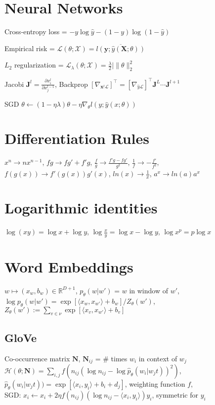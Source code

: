 \documentclass[a4paper, 11pt, landscape]{article}
\begin{document}
\begin{multicols*}{3}
\section{Neural Networks}
Cross-entropy loss = $-y\log\hat{y}-(1-y)\log(1-
\hat{y})$

Empirical risk = $ \mathcal{L}(\theta;\mathcal{X}) = \overline{l(\mathbf{y};\hat{y}(\mathbf{X};\theta))}$

$L_2$ regularization = $\mathcal{L}_\lambda(\theta;\mathcal{X}) = \frac{\lambda}{2}|\|\theta\|^2_2$

Jacobi $\mathbf{J}^l=\frac{\partial x^l_i}{\partial x^{l-1}_j}$,
Backprop $[\nabla_{\mathbf{x}^l\mathcal{L}}]^\top = [\nabla_{\hat{y}\mathcal{L}}]^\top \mathbf{J}^L \cdots \mathbf{J}^{l+1}$

SGD $\theta \gets (1-\eta\lambda)\theta-\eta\nabla_\theta l(y;\hat{y}(x;\theta))$

\section{Differentiation Rules}
$x^n \rightarrow nx^{n-1}$, 
$fg \rightarrow fg'+f'g$,
$\frac{f}{g} \rightarrow \frac{f'g-fg'}{g^2}$,
$\frac{1}{f} \rightarrow -\frac{f'}{f^2}$,
$f(g(x)) \rightarrow f'(g(x))g'(x)$,
$ln(x) \rightarrow \frac{1}{x}$,
$a^x \rightarrow ln(a)a^x$

\section{Logarithmic identities}
$\log(xy) = \log x + \log y$,
$\log\frac{x}{y} = \log x - \log y$,
$\log x^p = p \log x$

\section{Word Embeddings}
$w \mapsto (x_w,b_w) \in \mathbb{R}^{D+1}$,
$p_\theta (w|w')$ = $w$ in window of $w'$,
$\log p_\theta (w|w') = \exp[\langle x_w,x_{w'} \rangle + b_w] / Z_\theta (w')$,\\ $Z_\theta (w') := \sum_{v \in \nu}\exp[ \langle x_v,x_{w'} \rangle + b_v ]$

\subsection{GloVe}
Co-occurrence matrix $\mathbf{N}$, $\mathbf{N}_{ij}$ = \# times $w_i$ in context of $w_j$ \\
$\mathcal{H}(\theta;\mathbf{N}) = \sum_{i,j}f(n_{ij}(\log n_{ij} - \log \hat{p}_\theta (w_i|w_jt))^2)$,\\
$\hat{p}_\theta (w_i|w_jt)) = \exp [\langle x_i,y_i \rangle +b_i + d_j ] $, weighting function $f$,\\
SGD: $x_i \gets x_i + 2\eta f(n_{ij})(\log n_{ij} - \langle x_i,y_i \rangle ) y_i$, symmetric for $y_i$



\end{multicols*}
\end{document}
